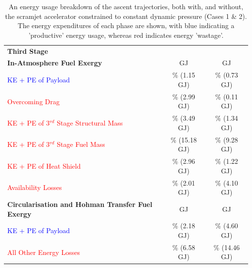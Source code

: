 \begin{table}[ht]
\begin{tabular}{l c c}
		\textbf{Third Stage}& & \\
		\textbf{In-Atmosphere Fuel Exergy} 
		& \textbf{\thirdEnergyConstqNoReturn}  GJ & \textbf{\thirdEnergyStandardNoReturn}  GJ
		\\
		\textcolor{blue}{KE + PE of Payload}  
		&\thirddExergyEffAtmConstqNoReturn \% (1.15 GJ) &\thirddExergyEffAtmStandardNoReturn \% (0.73 GJ)
		\\
		\textcolor{red}{Overcoming Drag}  
		& \WDthreeConstqNoReturn \% (2.99 GJ) & \WDthreeStandardNoReturn \% (0.11 GJ)
		\\
		\textcolor{red}{KE + PE  of 3$^{rd}$ Stage Structural Mass}  
		& \WthreeConstqNoReturn \% (3.49 GJ) & \WthreeStandardNoReturn \% (1.34 GJ)
		\\
	
		\textcolor{red}{KE + PE  of 3$^{rd}$ Stage Fuel Mass}  
		& \WmFthreeConstqNoReturn \% (15.18 GJ) & \WmFthreeStandardNoReturn \% (9.28 GJ)
		\\
		\textcolor{red}{KE + PE of Heat Shield}  
		& \WHSthreeConstqNoReturn \% (2.96 GJ) & \WHSthreeStandardNoReturn \% (1.22 GJ)
		\\
		\textcolor{red}{Availability Losses}   
		& \PlossthreeConstqNoReturn \% (2.01 GJ) & \PlossthreeStandardNoReturn \% (4.10 GJ)
		\\
		\textbf{Circularisation and Hohman Transfer Fuel Exergy}  
		& \textbf{\HTExergyConstqNoReturn}  GJ & \textbf{\HTExergyStandardNoReturn}  GJ
		\\
		\textcolor{blue}{KE + PE of Payload}  
		& \HTeffConstqNoReturn \% (2.18 GJ) & \HTeffStandardNoReturn \% (4.60 GJ)
		\\
		\textcolor{red}{All Other Energy Losses}  
		& \HTlossConstqNoReturn \% (6.58 GJ) & \HTlossStandardNoReturn \% (14.46 GJ)
		\\
		\hline 
	\end{tabular} 
	\caption{An energy usage breakdown of the ascent trajectories, both with, and without, the scramjet accelerator constrained to constant dynamic pressure (Cases 1 \& 2). The energy expenditures of each phase are shown, with blue indicating a 'productive' energy usage, whereas red indicates energy 'wastage'.}
	\label{tab:effStandardNoReturn}
\end{table}



